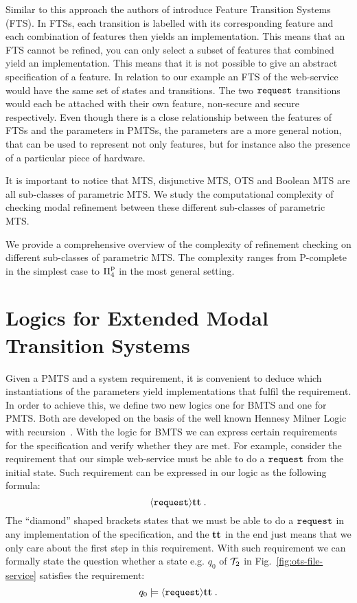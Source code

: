 Similar to this approach the authors of \cite{Classen2010} introduce Feature Transition Systems (FTS). In FTSs, each transition is labelled with its corresponding feature and each combination of features then yields an implementation. This means that an FTS cannot be refined, you can only select a subset of features that combined yield an implementation. This means that it is not possible to give an abstract specification of a feature. In relation to our example an FTS of the web-service would have the same set of states and transitions. The two $\mathtt{request}$ transitions would each be attached with their own feature, non-secure and secure respectively. Even though there is a close relationship between the features of FTSs and the parameters in PMTSs, the parameters are a more general notion, that can be used to represent not only features, but for instance also the presence of a particular piece of hardware. 

It is important to notice that MTS, disjunctive MTS, OTS and Boolean MTS are all sub-classes of parametric MTS. We study the computational complexity of checking modal refinement between these different sub-classes of parametric MTS.

\begin{result}
    We provide a comprehensive overview of the complexity of refinement checking on different sub-classes of parametric MTS. The complexity ranges from P-complete in the simplest case to $\mathrm\Pi^\mathrm p_4$ in the most general setting.
\end{result}


\section{Logics for Extended Modal Transition Systems}
Given a PMTS and a system requirement, it is convenient to deduce which instantiations of the parameters yield implementations that fulfil the requirement. In order to achieve this, we define two new logics one for BMTS and one for PMTS. Both are developed on the basis of the well known Hennesy Milner Logic with recursion~\cite{DBLP:conf/caap/Larsen88}. With the logic for BMTS we can express certain requirements for the specification and verify whether they are met. For example, consider the requirement that our simple web-service must be able to do  a $\mathtt{request}$ from the initial state. Such requirement can be expressed in our logic as the following formula:
\[
    \langle  \mathtt{request}  \rangle\mathbf{tt}\;.
\]
The ``diamond'' shaped brackets states that we must be able to do a $\mathtt{request}$ in any implementation of the specification, and the $\mathbf{tt}$ in the end just means that we only care about the first step in this requirement.
With such requirement we can formally state the question whether a state e.g. $q_0$ of $\mathcal{T}_2$ in Fig.~\ref{fig:ots-file-service} satisfies the requirement: 
\[
    q_0 \models \langle  \mathtt{request}  \rangle\mathbf{tt}\;.
\]

